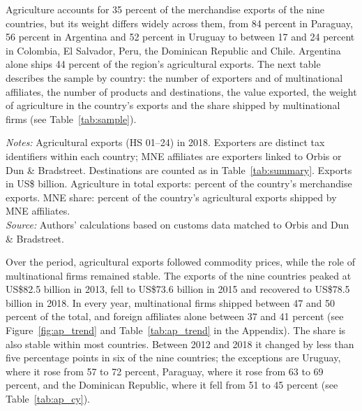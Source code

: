 \documentclass[11pt,a4paper]{article}
\newcommand{\srcnote}{\textit{Source:} Authors' calculations based on customs data matched to Orbis and Dun \& Bradstreet.}
\begin{document}
Agriculture accounts for 35 percent of the merchandise exports of the nine countries, but its weight
differs widely across them, from 84 percent in Paraguay, 56 percent in Argentina and 52 percent in
Uruguay to between 17 and 24 percent in Colombia, El Salvador, Peru, the Dominican Republic and
Chile. Argentina alone ships 44 percent of the region's agricultural exports. The next table
describes the sample by country: the number of exporters and of multinational affiliates, the number
of products and destinations, the value exported, the weight of agriculture in the country's exports
and the share shipped by multinational firms (see Table~\ref{tab:sample}).
\begin{table}[H]\centering\footnotesize%
  \caption{Agricultural Exports, by Exporting Country, 2018}%
  \label{tab:sample}%
  \par\vspace{3pt}%
  \begin{minipage}{0.95\textwidth}\footnotesize %
  \textit{Notes:} Agricultural exports (HS 01--24) in 2018. Exporters are distinct tax identifiers within each country; MNE affiliates are exporters linked to Orbis or Dun \& Bradstreet. Destinations are counted as in Table~\ref{tab:summary}. Exports in US\$ billion. Agriculture in total exports: percent of the country's merchandise exports. MNE share: percent of the country's agricultural exports shipped by MNE affiliates.\\[3pt]%
  \srcnote%
  \end{minipage}%
  \end{table}

Over the period, agricultural exports followed commodity prices, while the role of multinational
firms remained stable. The exports of the nine countries peaked at US\$82.5 billion in 2013, fell
to US\$73.6 billion in 2015 and recovered to US\$78.5 billion in 2018. In every year,
multinational firms shipped between 47 and 50 percent of the total, and foreign affiliates alone
between 37 and 41 percent (see Figure~\ref{fig:ap_trend} and Table~\ref{tab:ap_trend} in the
Appendix). The share is also stable within most countries. Between 2012 and 2018 it changed by less
than five percentage points in six of the nine countries; the exceptions are Uruguay, where it rose
from 57 to 72 percent, Paraguay, where it rose from 63 to 69 percent, and the Dominican Republic,
where it fell from 51 to 45 percent (see Table~\ref{tab:ap_cy}).
\end{document}
